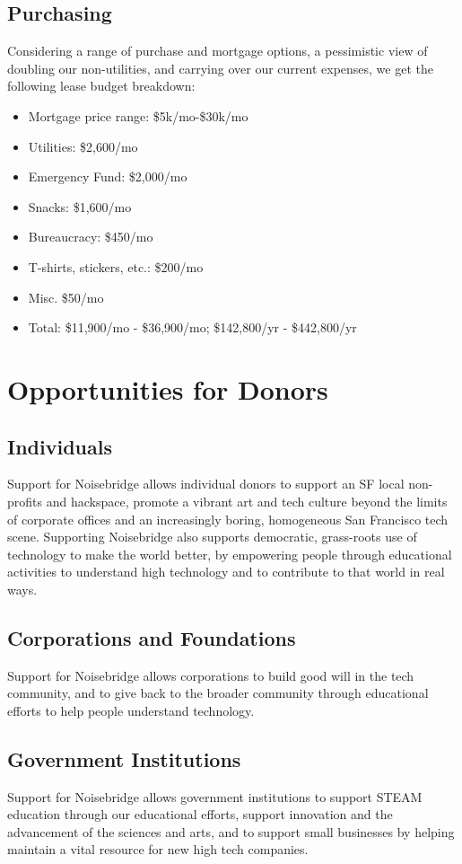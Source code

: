 \documentclass[12pt]{article}
\begin{document}
\subsection{Purchasing}

Considering a range of purchase and mortgage options, a pessimistic view of doubling our non-utilities, and carrying over our current expenses, we get the following lease budget breakdown:

\begin{itemize}
    \item Mortgage price range: \$5k/mo-\$30k/mo
    \item Utilities: \$2,600/mo
    \item Emergency Fund: \$2,000/mo
    \item Snacks: \$1,600/mo
    \item Bureaucracy: \$450/mo
    \item T-shirts, stickers, etc.: \$200/mo
    \item Misc. \$50/mo
    \item Total: \$11,900/mo - \$36,900/mo;  \$142,800/yr - \$442,800/yr
\end{itemize}

\section{Opportunities for Donors}

\subsection{Individuals}

Support for Noisebridge allows individual donors to support an SF local non-profits and hackspace, promote a vibrant art and tech culture beyond the limits of corporate offices and an increasingly boring, homogeneous San Francisco tech scene. Supporting Noisebridge also supports democratic, grass-roots use of technology to make the world better, by empowering people through educational activities to understand high technology and to contribute to that world in real ways.

\subsection{Corporations and Foundations}

Support for Noisebridge allows corporations to build good will in the tech community, and to give back to the broader community through educational efforts to help people understand technology.

\subsection{Government Institutions}

Support for Noisebridge allows government institutions to support STEAM education through our educational efforts, support innovation and the advancement of the sciences and arts, and to support small businesses by helping maintain a vital resource for new high tech companies.
\end{document}
